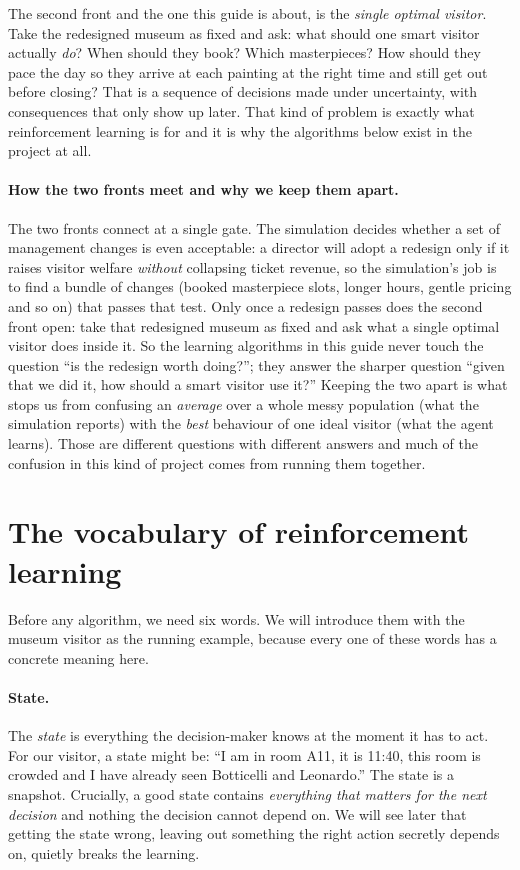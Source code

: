 \documentclass[11pt]{article}
\newcommand{\key}[1]{\textit{#1}}            %
\begin{document}
The second front and the one this guide is about, is the \key{single optimal visitor}.
Take the redesigned museum as fixed and ask: what should one smart visitor actually
\emph{do}? When should they book? Which masterpieces? How should they pace the day so
they arrive at each painting at the right time and still get out before closing? That is
a sequence of decisions made under uncertainty, with consequences that only show up
later. That kind of problem is exactly what reinforcement learning is for and it is why
the algorithms below exist in the project at all.

\paragraph{How the two fronts meet and why we keep them apart.} The two fronts connect at a
single gate. The simulation decides whether a set of management changes is even acceptable: a
director will adopt a redesign only if it raises visitor welfare \emph{without} collapsing
ticket revenue, so the simulation's job is to find a bundle of changes (booked masterpiece
slots, longer hours, gentle pricing and so on) that passes that test. Only once a redesign
passes does the second front open: take that redesigned museum as fixed and ask what a
single optimal visitor does inside it. So the learning algorithms in this guide never touch
the question ``is the redesign worth doing?''; they answer the sharper question ``given that
we did it, how should a smart visitor use it?'' Keeping the two apart is what stops us from
confusing an \emph{average} over a whole messy population (what the simulation reports) with
the \emph{best} behaviour of one ideal visitor (what the agent learns). Those are different
questions with different answers and much of the confusion in this kind of project comes
from running them together.

\section{The vocabulary of reinforcement learning}\label{sec:vocab}

Before any algorithm, we need six words. We will introduce them with the museum visitor
as the running example, because every one of these words has a concrete meaning here.

\paragraph{State.} The \key{state} is everything the decision-maker knows at the moment
it has to act. For our visitor, a state might be: ``I am in room A11, it is 11:40, this
room is crowded and I have already seen Botticelli and Leonardo.'' The state is a
snapshot. Crucially, a good state contains \emph{everything that matters for the next
decision} and nothing the decision cannot depend on. We will see later that getting the
state wrong, leaving out something the right action secretly depends on, quietly breaks
the learning.
\end{document}
